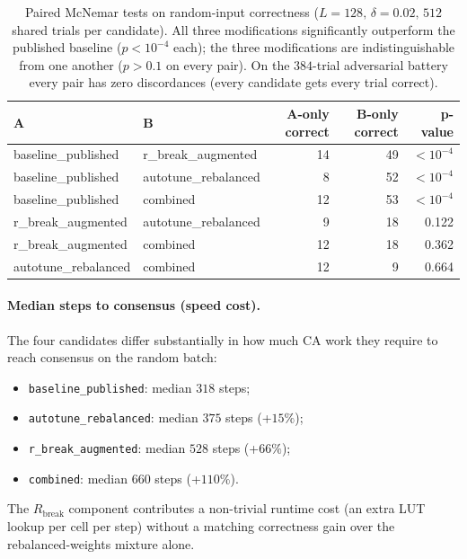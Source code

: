 \documentclass[11pt,a4paper]{article}
\begin{document}
\begin{table}[h]\centering\small
\begin{tabular}{l l r r r}
\toprule
A & B & A-only correct & B-only correct & p-value \\
\midrule
baseline\_published & r\_break\_augmented           & 14 & 49 & \textbf{\(< 10^{-4}\)} \\
baseline\_published & autotune\_rebalanced          &  8 & 52 & \textbf{\(< 10^{-4}\)} \\
baseline\_published & combined                      & 12 & 53 & \textbf{\(< 10^{-4}\)} \\
r\_break\_augmented & autotune\_rebalanced          &  9 & 18 & 0.122 \\
r\_break\_augmented & combined                      & 12 & 18 & 0.362 \\
autotune\_rebalanced & combined                     & 12 &  9 & 0.664 \\
\bottomrule
\end{tabular}
\caption{Paired McNemar tests on random-input correctness
(\(L=128,\,\delta=0.02,\,512\) shared trials per candidate).  All
three modifications significantly outperform the published baseline
(\(p < 10^{-4}\) each); the three modifications are
indistinguishable from one another (\(p > 0.1\) on every pair).
On the \(384\)-trial adversarial battery every pair has zero
discordances (every candidate gets every trial correct).}
\label{tab:h2h-mcnemar}
\end{table}

\paragraph{Median steps to consensus (speed cost).}
The four candidates differ substantially in how much CA work they
require to reach consensus on the random batch:

\begin{itemize}
\item \texttt{baseline\_published}: median \(318\) steps;
\item \texttt{autotune\_rebalanced}: median \(375\) steps (+\(15\%\));
\item \texttt{r\_break\_augmented}: median \(528\) steps (+\(66\%\));
\item \texttt{combined}: median \(660\) steps (+\(110\%\)).
\end{itemize}
The \(R_{\mathrm{break}}\) component contributes a non-trivial
runtime cost (an extra LUT lookup per cell per step) without a
matching correctness gain over the rebalanced-weights mixture alone.
\end{document}
